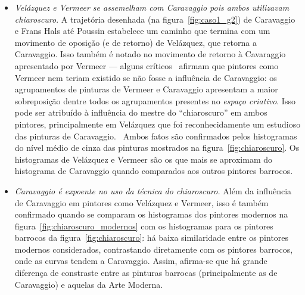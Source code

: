 \begin{itemize}
  \item \textit{Velázquez e Vermeer se assemelham com Caravaggio pois
    ambos utilizavam \textit{chiaroscuro}}. A trajetória desenhada (na
    figura~\ref{fig:caso1_g2}) de Caravaggio e Frans Hals até Poussin
    estabelece um caminho que termina com um movimento de oposição (e
    de retorno) de Vel\'{a}zquez, que retorna a Caravaggio.  Isso
    também é notado no movimento de retorno à Cavaraggio apresentado
    por Vermeer --- alguns críticos~\cite{lambert} afirmam que
    pintores como Vermeer nem teriam existido se não fosse a
    influência de Caravaggio: os agrupamentos de pinturas de Vermeer e
    Caravaggio apresentam a maior sobreposição dentre todos os
    agrupamentos presentes no \textit{espaço criativo}. Isso pode ser
    atribuído à influência do mestre do ``chiaroscuro'' em ambos
    pintores, principalmente em Vel\'{a}zquez que foi reconhecidamente
    um estudioso das pinturas de Caravaggio.~\cite{gombrich} Ambos
    fatos são confirmados pelos histogramas do nível médio de cinza
    das pinturas mostrados na figura~\ref{fig:chiaroscuro}. Os
    histogramas de Velázquez e Vermeer são os que mais se aproximam do
    histograma de Caravaggio quando comparados aos outros pintores
    barrocos.

    \item \textit{Caravaggio é expoente no uso da técnica
      do \textit{chiaroscuro}.} Além da influência de Caravaggio em
      pintores como Velázquez e Vermeer, isso é também confirmado
      quando se comparam os histogramas dos pintores modernos na
      figura~\ref{fig:chiaroscuro_modernos} com os histogramas para os
      pintores barrocos da figura~\ref{fig:chiaroscuro}: há baixa
      similaridade entre os pintores modernos considerados,
      contrastando diretamente com os pintores barrocos, onde as
      curvas tendem a Caravaggio. Assim, afirma-se que há grande
      diferença de constraste entre as pinturas barrocas
      (principalmente as de Caravaggio) e aquelas da Arte Moderna.
\end{itemize}

